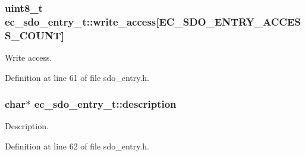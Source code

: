 \subsubsection[{write\-\_\-access}]{\setlength{\rightskip}{0pt plus 5cm}uint8\-\_\-t {\bf ec\-\_\-sdo\-\_\-entry\-\_\-t\-::write\-\_\-access}[{\bf \-E\-C\-\_\-\-S\-D\-O\-\_\-\-E\-N\-T\-R\-Y\-\_\-\-A\-C\-C\-E\-S\-S\-\_\-\-C\-O\-U\-N\-T}]}\label{structec__sdo__entry__t_a06615e177748b777d53f333c3790614d}


\-Write access. 



\-Definition at line 61 of file sdo\-\_\-entry.\-h.

\subsubsection[{description}]{\setlength{\rightskip}{0pt plus 5cm}char$\ast$ {\bf ec\-\_\-sdo\-\_\-entry\-\_\-t\-::description}}\label{structec__sdo__entry__t_ad145c04a675a87b012e0b2666b8b9453}


\-Description. 



\-Definition at line 62 of file sdo\-\_\-entry.\-h.

